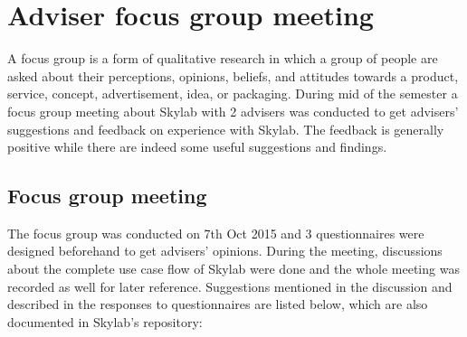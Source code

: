 \chapter{Adviser focus group meeting} \label{focusgroupmeeting}

A focus group is a form of qualitative research in which a group of people are asked about their perceptions, opinions, beliefs, and attitudes towards a product, service, concept, advertisement, idea, or packaging\cite{citation15}. During mid of the semester a focus group meeting about Skylab with 2 advisers was conducted to get advisers' suggestions and feedback on experience with Skylab. The feedback is generally positive while there are indeed some useful suggestions and findings.

\section{Focus group meeting}

The focus group was conducted on 7th Oct 2015 and 3 questionnaires were designed beforehand to get advisers' opinions. During the meeting, discussions about the complete use case flow of Skylab were done and the whole meeting was recorded as well for later reference. Suggestions mentioned in the discussion and described in the responses to questionnaires are listed below, which are also documented in Skylab's repository:

